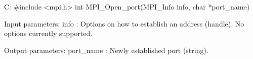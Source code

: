 C:
#include <mpi.h>
int MPI_Open_port(MPI_Info info, char *port_name)

Input parameters:
info : Options on how to establish an address (handle). No options currently supported.

Output parameters:
port_name : Newly established port (string).
